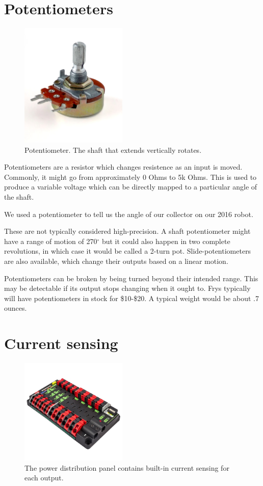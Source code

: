\documentclass{article}
\begin{document}
\section{Potentiometers}
\begin{figure}[ht]
\centering
\includegraphics[width=2in]{Potentiometer.jpg}
\caption{Potentiometer.  The shaft that extends vertically rotates.}
\end{figure}

Potentiometers are a resistor which changes resistence as an input is moved.  Commonly, it might go from approximately 0 Ohms to 5k Ohms.  This is used to produce a variable voltage which can be directly mapped to a particular angle of the shaft.  

We used a potentiometer to tell us the angle of our collector on our 2016 robot.

These are not typically considered high-precision.  A shaft potentiometer might have a range of motion of 270$^{\circ}$ but it could also happen in two complete revolutions, in which case it would be called a 2-turn pot.  Slide-potentiometers are also available, which change their outputs based on a linear motion.

Potentiometers can be broken by being turned beyond their intended range.  This may be detectable if its output stops changing when it ought to.  Frys typically will have potentiometers in stock for \$10-\$20.  A typical weight would be about .7 ounces.  

\section{Current sensing}
\begin{figure}[ht]
\centering
\includegraphics[width=2in]{pdp.jpg}
\caption{The power distribution panel contains built-in current sensing for each output.}
\end{figure}
\end{document}
